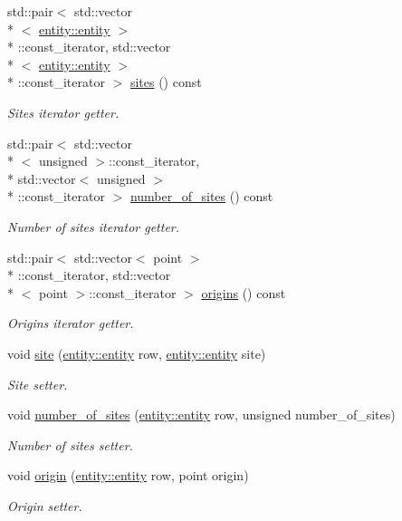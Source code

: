 \begin{DoxyCompactItemize}
std\-::pair$<$ std\-::vector\\*
$<$ \hyperlink{classophidian_1_1entity_1_1entity}{entity\-::entity} $>$\\*
\-::const\-\_\-iterator, std\-::vector\\*
$<$ \hyperlink{classophidian_1_1entity_1_1entity}{entity\-::entity} $>$\\*
\-::const\-\_\-iterator $>$ \hyperlink{classophidian_1_1floorplan_1_1rows_a259f8f0511ad0e1c139b97a418aca957}{sites} () const 
\begin{DoxyCompactList}\small\item\em Sites iterator getter. \end{DoxyCompactList}\item 
std\-::pair$<$ std\-::vector\\*
$<$ unsigned $>$\-::const\-\_\-iterator, \\*
std\-::vector$<$ unsigned $>$\\*
\-::const\-\_\-iterator $>$ \hyperlink{classophidian_1_1floorplan_1_1rows_ad9da40317e6b4eaada1893b925bca1f4}{number\-\_\-of\-\_\-sites} () const 
\begin{DoxyCompactList}\small\item\em Number of sites iterator getter. \end{DoxyCompactList}\item 
std\-::pair$<$ std\-::vector$<$ point $>$\\*
\-::const\-\_\-iterator, std\-::vector\\*
$<$ point $>$\-::const\-\_\-iterator $>$ \hyperlink{classophidian_1_1floorplan_1_1rows_a37a388de47fe14525780086d17e3bcfb}{origins} () const 
\begin{DoxyCompactList}\small\item\em Origins iterator getter. \end{DoxyCompactList}\item 
void \hyperlink{classophidian_1_1floorplan_1_1rows_ac4ea14b0ce48d27aca9b8522bb501b14}{site} (\hyperlink{classophidian_1_1entity_1_1entity}{entity\-::entity} row, \hyperlink{classophidian_1_1entity_1_1entity}{entity\-::entity} site)
\begin{DoxyCompactList}\small\item\em Site setter. \end{DoxyCompactList}\item 
void \hyperlink{classophidian_1_1floorplan_1_1rows_a590b0a0b337edaa5d52d2ad272cd6736}{number\-\_\-of\-\_\-sites} (\hyperlink{classophidian_1_1entity_1_1entity}{entity\-::entity} row, unsigned number\-\_\-of\-\_\-sites)
\begin{DoxyCompactList}\small\item\em Number of sites setter. \end{DoxyCompactList}\item 
void \hyperlink{classophidian_1_1floorplan_1_1rows_a497e85a03604c2c3fb1f44fdbeafa260}{origin} (\hyperlink{classophidian_1_1entity_1_1entity}{entity\-::entity} row, point origin)
\begin{DoxyCompactList}\small\item\em Origin setter. \end{DoxyCompactList}\end{DoxyCompactItemize}


